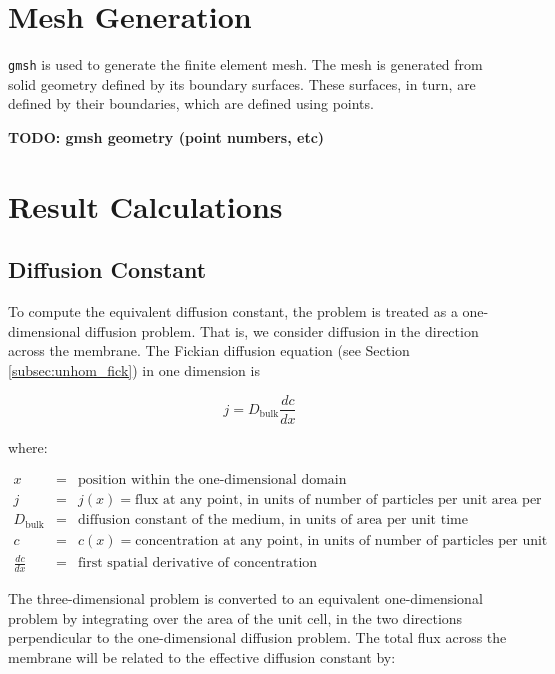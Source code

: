 \documentclass{article}
\begin{document}
\section{Mesh Generation}\label{sec:meshgen}

\texttt{gmsh} is used to generate the finite element mesh.
The mesh is generated from solid geometry defined by its boundary surfaces.
These surfaces, in turn, are defined by their boundaries,
which are defined using points.

\textbf{TODO: gmsh geometry (point numbers, etc)}

\section{Result Calculations}

\subsection{Diffusion Constant}\label{subsec:D_eff}

To compute the equivalent diffusion constant, the problem is treated as a one-dimensional diffusion problem.
That is, we consider diffusion in the direction across the membrane.
The Fickian diffusion equation (see Section \ref{subsec:unhom_fick}) in one dimension is

$$j = D_{\text{bulk}} \frac{dc}{dx}$$

where:

$\begin{array}{rcl}
x & = & \text{position within the one-dimensional domain} \\
j & = & j(x) = \text{flux at any point, in units of number of particles per unit area per unit time} \\
D_{\text{bulk}} & = & \text{diffusion constant of the medium, in units of area per unit time} \\
c & = & c(x) = \text{concentration at any point, in units of number of particles per unit volume} \\
\frac{dc}{dx} & = & \text{first spatial derivative of concentration}
\end{array}$

The three-dimensional problem is converted to an equivalent one-dimensional problem
by integrating over the area of the unit cell, in the two directions perpendicular to
the one-dimensional diffusion problem.
The total flux across the membrane will be related to the effective diffusion constant by:
\end{document}
